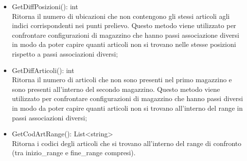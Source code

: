 \begin{itemize}
    \item GetDiffPosizioni(): int \\
    Ritorna il numero di ubicazioni che non contengono gli stessi articoli agli indici corrispondenti nei punti prelievo.
    Questo metodo viene utilizzato per confrontare configurazioni di magazzino che hanno passi associazione diversi in modo da poter capire quanti articoli non si trovano nelle stesse posizioni
    rispetto a passi associazioni diversi;\\
    \item GetDiffArticoli(): int \\
    Ritorna il numero di articoli che non sono presenti nel primo magazzino e sono presenti all'interno del secondo magazzino.
    Questo metodo viene utilizzato per confrontare configurazioni di magazzino che hanno passi diversi in modo da poter capire quanti articoli non si trovano all'interno del range in passi associazioni diversi;\\
    \item GetCodArtRange(): List<string> \\
    Ritorna i codici degli articoli che si trovano all'interno del range di confronto (tra inizio\_range e fine\_range compresi).\\
\end{itemize} 
